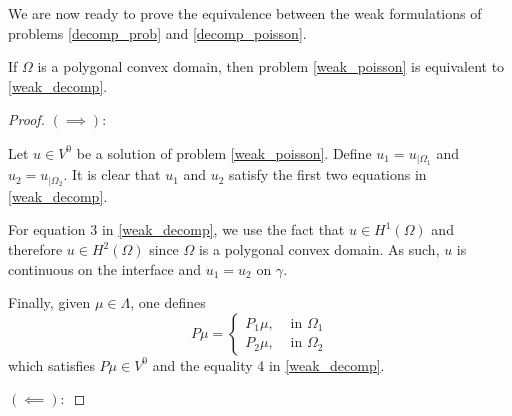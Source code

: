 We are now ready to prove the equivalence between the weak formulations of problems \eqref{decomp_prob} and \eqref{decomp_poisson}.
\begin{theorem}\label{equivalence_transmission}
    If \(\Omega\) is a polygonal convex domain, then problem \eqref{weak_poisson} is equivalent to \eqref{weak_decomp}.
\end{theorem}
\begin{proof}
    \((\implies):\)

    Let \(u \in V^0\) be a solution of problem \eqref{weak_poisson}. Define \(u_1 = u_{|\Omega_1}\) and \(u_2 = u_{|\Omega_2}\). It is clear that \(u_1\) and \(u_2\) satisfy the first two equations in \eqref{weak_decomp}.

    For equation 3 in \eqref{weak_decomp}, we use the fact that \(u \in H^1(\Omega)\) and therefore \(u \in H^2(\Omega)\) since \(\Omega\) is a polygonal convex domain. As such, \(u\) is continuous on the interface and \(u_1=u_2\) on \(\gamma\).

    Finally, given \(\mu \in \Lambda\), one defines
    \[
        P \mu =
    \begin{cases}
        P_1 \mu, & \text{ in } \Omega_1\\
        P_2 \mu, & \text{ in } \Omega_2
    \end{cases}
    \]
    which satisfies \(P \mu \in V^0\) and the equality 4 in \eqref{weak_decomp}.

    \vspace*{0.5cm}
    \((\impliedby):\)


\end{proof}
